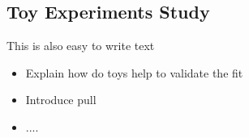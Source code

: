 

\subsection{Toy Experiments Study}

{\color{red} This is also easy to write text}
\begin{itemize}
\item Explain how do toys help to validate the fit
\item Introduce pull
\item ....
\end{itemize}

